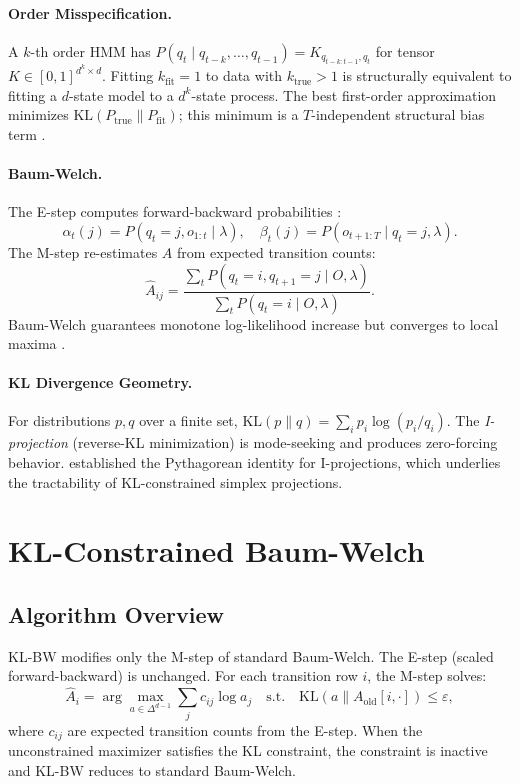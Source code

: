 \documentclass[11pt,letterpaper]{article}
\begin{document}
\paragraph{Order Misspecification.}
A $k$-th order HMM has $P(q_t \mid q_{t-k}, \ldots, q_{t-1}) = K_{q_{t-k:t-1}, q_t}$ for tensor
$K \in [0,1]^{d^k \times d}$. Fitting $k_\text{fit}=1$ to data with $k_\text{true} > 1$ is structurally equivalent to
fitting a $d$-state model to a $d^k$-state process. The best first-order approximation minimizes
$\mathrm{KL}(P_\text{true} \| P_\text{fit})$; this minimum is a $T$-independent structural bias term
\citep{Douc2011,Douc2012}.

\paragraph{Baum-Welch.}
The E-step computes forward-backward probabilities \citep{Rabiner1989}:
\[
  \alpha_t(j) = P(q_t=j, o_{1:t} \mid \lambda), \quad \beta_t(j) = P(o_{t+1:T} \mid q_t=j, \lambda).
\]
The M-step re-estimates $A$ from expected transition counts:
\[
  \hat{A}_{ij} = \frac{\sum_t P(q_t=i, q_{t+1}=j \mid O, \lambda)}{\sum_t P(q_t=i \mid O, \lambda)}.
\]
Baum-Welch guarantees monotone log-likelihood increase but converges to local maxima \citep{Baum1970,Yang2015}.

\paragraph{KL Divergence Geometry.}
For distributions $p, q$ over a finite set, $\mathrm{KL}(p \| q) = \sum_i p_i \log(p_i / q_i)$. The \emph{I-projection}
(reverse-KL minimization) is mode-seeking and produces zero-forcing behavior. \citet{Csiszar1975} established the
Pythagorean identity for I-projections, which underlies the tractability of KL-constrained simplex projections.

\section{KL-Constrained Baum-Welch}
\label{sec:klbw}

\subsection{Algorithm Overview}

KL-BW modifies only the M-step of standard Baum-Welch. The E-step (scaled forward-backward) is unchanged. For each
transition row $i$, the M-step solves:
\[
  \hat{A}_i = \arg\max_{a \in \Delta^{d-1}} \sum_j c_{ij} \log a_j \quad \text{s.t.} \quad
  \mathrm{KL}(a \| A_\text{old}[i, \cdot]) \leq \varepsilon,
\]
where $c_{ij}$ are expected transition counts from the E-step. When the unconstrained maximizer satisfies the KL constraint,
the constraint is inactive and KL-BW reduces to standard Baum-Welch.
\end{document}
